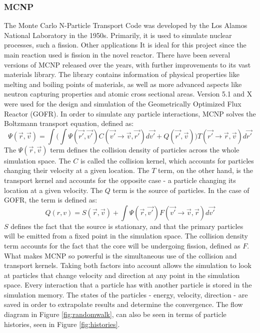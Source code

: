 \subsubsection{MCNP}
The Monte Carlo N-Particle Transport Code was developed by the Los Alamos National Laboratory in the 1950s. Primarily, it is used to simulate nuclear processes, such a fission. Other applications It is ideal for this project since the main reaction used is fission in the novel reactor. There have been several versions of MCNP released over the years, with further improvements to its vast materials library. The library contains information of physical properties like melting and boiling points of materials, as well as more advanced aspects like neutron capturing properties and atomic cross sectional areas. Version 5.1 and X were used for the design and simulation of the Geometrically Optimized Flux Reactor (GOFR). In order to simulate any particle interactions, MCNP solves the Boltzmann transport equation, defined as:
\begin{equation}
\Psi(\vec{r},\vec{v}) = \int\Big(\int\Psi(\vec{r'},\vec{v'})C(\vec{v'}\rightarrow \vec{v},\vec{r'})d\vec{v'} + Q(\vec{r'},\vec{v})\Big)T(\vec{r'}\rightarrow \vec{r},\vec{v})d\vec{r'}
\end{equation}
The $\Psi(\vec{r},\vec{v})$ term defines the collision density of particles across the whole simulation space. The $C$ is called the collision kernel, which accounts for particles changing their velocity at a given location. The $T$ term, on the other hand, is the transport kernel and accounts for the opposite case - a particle changing its location at a given velocity. The $Q$ term is the source of particles. In the case of GOFR, the term is defined as:
\begin{equation}
Q(r,v) = S(\vec{r},\vec{v}) + \int\Psi(\vec{r},\vec{v'})F(\vec{v'}\rightarrow \vec{v},\vec{r})d\vec{v'}
\end{equation}
$S$ defines the fact that the source is stationary, and that the primary particles will be emitted from a fixed point in the simulation space. The collision density term accounts for the fact that the core will be undergoing fission, defined as $F$. What makes MCNP so powerful is the simultaneous use of the collision and transport kernels. Taking both factors into account allows the simulation to look at particles that change velocity and direction at any point in the simulation space. Every interaction that a particle has with another particle is stored in the simulation memory. The states of the particles - energy, velocity, direction - are saved in order to extrapolate results and determine the convergence. The flow diagram in Figure \ref{fig:randomwalk}, can also be seen in terms of particle histories, seen in Figure \ref{fig:histories}.

